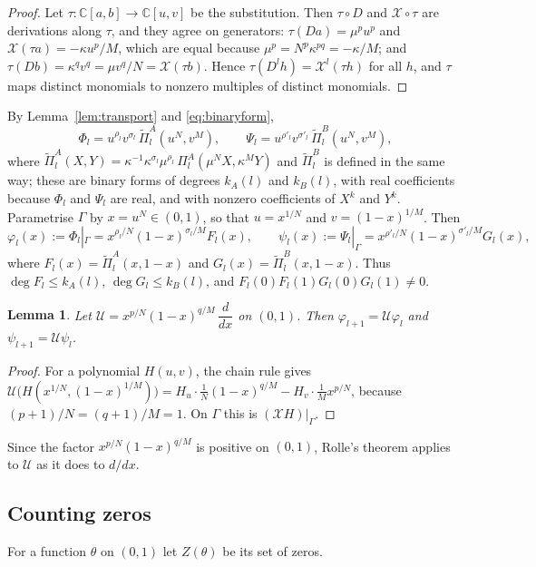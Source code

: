 \documentclass[11pt]{amsart}
\newtheorem{lemma}[theorem]{Lemma}
\theoremstyle{definition}
\theoremstyle{remark}
\numberwithin{equation}{section}
\newcommand{\C}{\mathbb{C}}
\newcommand{\cU}{\mathcal{U}}
\begin{document}
\begin{proof}
Let $\tau:\C[a,b]\to\C[u,v]$ be the substitution. Then $\tau\circ D$ and $\mathcal X\circ\tau$ are derivations along $\tau$, and they agree on generators: $\tau(Da)=\mu^pu^p$ and $\mathcal X(\tau a)=-\kappa u^p/M$, which are equal because $\mu^p=N^p\kappa^{pq}=-\kappa/M$; and $\tau(Db)=\kappa^qv^q=\mu v^q/N=\mathcal X(\tau b)$. Hence $\tau(D^lh)=\mathcal X^l(\tau h)$ for all $h$, and $\tau$ maps distinct monomials to nonzero multiples of distinct monomials.
\end{proof}

By Lemma~\ref{lem:transport} and \eqref{eq:binaryform},
\[
\Phi_l=u^{\rho_l}v^{\sigma_l}\,\tilde\Pi^A_l(u^N,v^M),\qquad \Psi_l=u^{\rho'_l}v^{\sigma'_l}\,\tilde\Pi^B_l(u^N,v^M),
\]
where $\tilde\Pi^A_l(X,Y)=\kappa^{-1}\kappa^{\sigma_l}\mu^{\rho_l}\,\Pi^A_l(\mu^NX,\kappa^MY)$ and $\tilde\Pi^B_l$ is defined in the same way; these are binary forms of degrees $k_A(l)$ and $k_B(l)$, with real coefficients because $\Phi_l$ and $\Psi_l$ are real, and with nonzero coefficients of $X^k$ and $Y^k$. Parametrise $\Gamma$ by $x=u^N\in(0,1)$, so that $u=x^{1/N}$ and $v=(1-x)^{1/M}$. Then
\begin{equation}\label{eq:phipsi}
\varphi_l(x):=\Phi_l|_\Gamma=x^{\rho_l/N}(1-x)^{\sigma_l/M}F_l(x),\qquad \psi_l(x):=\Psi_l|_\Gamma=x^{\rho'_l/N}(1-x)^{\sigma'_l/M}G_l(x),
\end{equation}
where $F_l(x)=\tilde\Pi^A_l(x,1-x)$ and $G_l(x)=\tilde\Pi^B_l(x,1-x)$. Thus $\deg F_l\le k_A(l)$, $\deg G_l\le k_B(l)$, and $F_l(0)F_l(1)G_l(0)G_l(1)\neq0$.

\begin{lemma}\label{lem:flow}
Let $\cU=x^{p/N}(1-x)^{q/M}\,\dfrac{d}{dx}$ on $(0,1)$. Then $\varphi_{l+1}=\cU\varphi_l$ and $\psi_{l+1}=\cU\psi_l$.
\end{lemma}

\begin{proof}
For a polynomial $H(u,v)$, the chain rule gives $\cU\bigl(H(x^{1/N},(1-x)^{1/M})\bigr)=H_u\cdot\frac1N(1-x)^{q/M}-H_v\cdot\frac1M x^{p/N}$, because $(p+1)/N=(q+1)/M=1$. On $\Gamma$ this is $(\mathcal XH)|_\Gamma$.
\end{proof}

Since the factor $x^{p/N}(1-x)^{q/M}$ is positive on $(0,1)$, Rolle's theorem applies to $\cU$ as it does to $d/dx$.

\subsection{Counting zeros}
For a function $\theta$ on $(0,1)$ let $Z(\theta)$ be its set of zeros.
\end{document}
